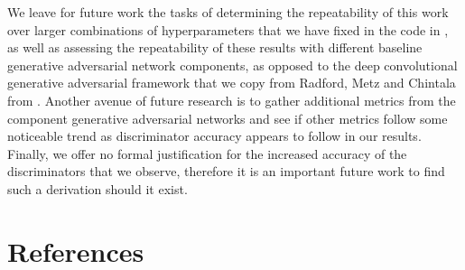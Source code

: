 \documentclass[conference]{IEEEtran}
\begin{document}
We leave for future work the tasks of determining the repeatability of this work
over larger combinations of hyperparameters that we have fixed in the code in
\cite{jhcgan}, as well as assessing the repeatability of these results with
different baseline generative adversarial network components, as opposed to the
deep convolutional generative adversarial framework that we copy from Radford,
Metz and Chintala from \cite{repLearnDcgan}.  Another avenue of future research
is to gather additional metrics from the component generative adversarial
networks and see if other metrics follow some noticeable trend as discriminator
accuracy appears to follow in our results.  Finally, we offer no formal
justification for the increased accuracy of the discriminators that we observe,
therefore it is an important future work to find such a derivation should it
exist.

\section{References}
\end{document}
